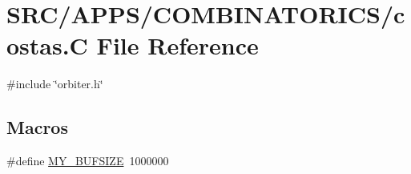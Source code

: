 \hypertarget{costas_8_c}{}\section{S\+R\+C/\+A\+P\+P\+S/\+C\+O\+M\+B\+I\+N\+A\+T\+O\+R\+I\+C\+S/costas.C File Reference}
\label{costas_8_c}
{\ttfamily \#include \char`\"{}orbiter.\+h\char`\"{}}\newline
\subsection*{Macros}
\begin{DoxyCompactItemize}
\item 
\#define \mbox{\hyperlink{costas_8_c_a6079b3b36c54787d2dca2de2fb2c96df}{M\+Y\+\_\+\+B\+U\+F\+S\+I\+ZE}}~1000000
\end{DoxyCompactItemize}
